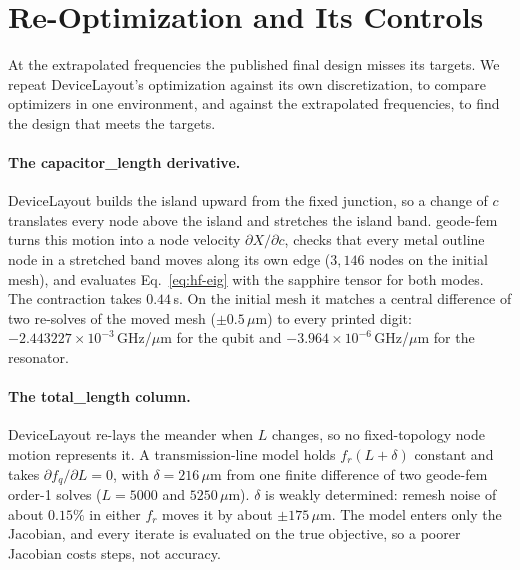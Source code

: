 \documentclass{anvil-paper}
\begin{document}
\section{Re-Optimization and Its Controls}
\label{sec:reopt}

At the extrapolated frequencies the published final design misses its
targets. We repeat DeviceLayout's optimization against its own
discretization, to compare optimizers in one environment, and against the
extrapolated frequencies, to find the design that meets the targets.

\paragraph{The capacitor\_length derivative.}
DeviceLayout builds the island upward from the fixed junction, so a change
of $c$ translates every node above the island and stretches the island
band. geode-fem turns this motion into a node velocity
$\partial X/\partial c$, checks that every metal outline node in a
stretched band moves along its own edge ($3{,}146$ nodes on the initial
mesh), and evaluates Eq.~\eqref{eq:hf-eig} with the sapphire tensor for both modes.
The contraction takes $0.44$\,s. On the initial mesh it matches a central
difference of two re-solves of the moved mesh ($\pm0.5\,\mu$m) to every
printed digit: $-2.443227\times10^{-3}$\,GHz/$\mu$m for the qubit and
$-3.964\times10^{-6}$\,GHz/$\mu$m for the resonator.

\paragraph{The total\_length column.}
DeviceLayout re-lays the meander when $L$ changes, so no fixed-topology
node motion represents it. A transmission-line model holds $f_r(L+\delta)$
constant and takes $\partial f_q/\partial L = 0$, with $\delta =
216\,\mu$m from one finite difference of two geode-fem order-1 solves
($L = 5000$ and $5250\,\mu$m). $\delta$ is weakly determined: remesh noise
of about $0.15\%$ in either $f_r$ moves it by about $\pm175\,\mu$m. The
model enters only the Jacobian, and every iterate is evaluated on the true
objective, so a poorer Jacobian costs steps, not accuracy.
\end{document}
